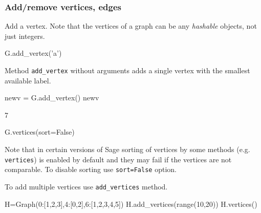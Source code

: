 \subsubsection*{Add/remove vertices, edges}

Add a vertex. Note that the vertices of a graph can be any \emph{hashable} objects, not just integers.
\begin{sageCell}
    G.add_vertex('a')
\end{sageCell}


Method \verb|add_vertex| without arguments adds a single vertex with the smallest available label.
\begin{sageCell}
    newv = G.add_vertex()
    newv
\end{sageCell}
\begin{outCell}
    7
\end{outCell}

\begin{sageCell}
    G.vertices(sort=False)
\end{sageCell}
\begin{outCell}
    ['a',7,0,1,2,3,4,5,6]
\end{outCell}
Note that in certain versions of Sage sorting of vertices by some methods (e.g. \verb|vertices|) is enabled by default and they may fail if the vertices are not comparable. To disable sorting use \verb|sort=False| option.

To add multiple vertices use \verb|add_vertices| method.
\begin{sageCell}
    H=Graph({0:[1,2,3],4:[0,2],6:[1,2,3,4,5]})
    H.add_vertices(range(10,20))
    H.vertices()
\end{sageCell}
\begin{outCell}
    [0,1,2,3,4,5,6,10,11,12,13,14,15,16,17,18,19]
\end{outCell}


